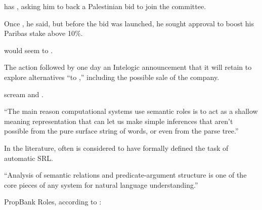 \begin{examples}
  \item {} has  , asking him to back a Palestinian bid to join the committee.
  \item Once   , he said, but before the bid was launched, he sought approval to boost his Paribas stake above 10\%.
  \item {} would seem to   .
  \item The action followed by one day an Intelogic announcement that it will retain  to explore alternatives ``to  ,'' including the possible sale of the company.
  \item {}  scream and   .
\end{examples}


``The main reason computational systems use semantic roles is to act as a shallow meaning
representation that can let us make simple inferences that aren’t possible from the pure surface
string of words, or even from the parse tree.'' \cite[p.~375]{jurafsky2019speech}

In the literature, often \cite{gildea2002automatic} is considered to have formally defined the
task of automatic SRL.

``Analysis of semantic relations and predicate-argument structure is one of the core pieces of any
system for natural language understanding.'' \citep{palmer2010semantic}

PropBank Roles, according to \cite{bonial2012english}:

